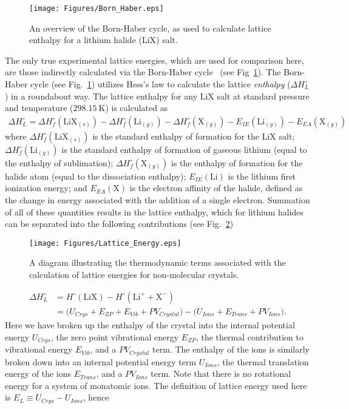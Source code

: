 \documentclass[preprint,aps,prb,floatfix]{revtex4-1}
\begin{document}
\begin{figure}
	\centering
	\texttt{[image: Figures/Born\_Haber.eps]}
	\caption{An overview of the Born-Haber cycle, as used to calculate lattice enthalpy for a lithium halide (LiX) salt.}
	\label{fig:Born_Haber}
\end{figure}
%
The only true experimental lattice energies, which are used for comparison here, are those indirectly calculated via the Born-Haber cycle~\cite{book:CRC,Jenkins2005,ladd1959calculation} (see Fig~\ref{fig:Born_Haber}). The Born-Haber cycle (see Fig.~\ref{fig:Born_Haber}) utilizes Hess's law to calculate the lattice \textit{enthalpy} ($\Delta H^{\circ}_{L}$) in a roundabout way. The lattice enthalpy for any LiX salt at standard pressure and temperature ($\SI{298.15}{\kelvin}$) is calculated as
\begin{align}
\Delta H^{\circ}_{L} = \Delta H^{\circ}_{f} (\text{LiX}_{(s)}) - \Delta H_{f}^{\circ} (\text{Li}_{(g)}) - \Delta H^{\circ}_{f} (\text{X}_{(g)}) - E_{IE} (\text{Li}_{(g)}) - E_{EA} (\text{X}_{(g)})
\end{align}
where $\Delta H^{\circ}_{f} (\text{LiX}_{(s)})$ is the standard enthalpy of formation for the LiX salt; $\Delta H_{f}^{\circ} (\text{Li}_{(g)})$ is the standard enthalpy of formation of gaseous lithium (equal to the enthalpy of sublimation); $\Delta H^{\circ}_{f} (\text{X}_{(g)})$ is the enthalpy of formation for the halide atom (equal to the dissociation enthalpy); $E_{IE} (\text{Li})$ is the lithium first ionization energy; and $E_{EA} (\text{X})$ is the electron affinity of the halide, defined as the change in energy associated with the addition of a single electron. Summation of all of these quantities results in the lattice enthalpy, which for lithium halides can be separated into the following contributions (see Fig.~\ref{fig:Lattice_Energy})
%
\begin{figure}
	\centering
	\texttt{[image: Figures/Lattice\_Energy.eps]}
	\caption{A diagram illustrating the thermodynamic terms associated with the calculation of lattice energies for non-molecular crystals.}
	\label{fig:Lattice_Energy}
\end{figure}
%
\begin{align}
\Delta H^{\circ}_{L} &= H^{\circ}(\text{LiX}) - H^{\circ} (\text{Li}^{+} + \text{X}^{-})\\
&= \big( U_{Crys} + E_{ZP} + E_{Vib} + PV_{Crystal} \big) - \big( U_{Ions} + E_{Trans} + PV_{Ions} \big).
\end{align}
Here we have broken up the enthalpy of the crystal into the internal potential energy $U_{Crys}$, the zero point vibrational energy $E_{ZP}$, the thermal contribution to vibrational energy $E_{Vib}$, and a $PV_{Crystal}$ term. The enthalpy of the ions is similarly broken down into an internal potential energy term $U_{Ions}$, the thermal translation energy of the ions $E_{Trans}$, and a $PV_{Ions}$ term. Note that there is no rotational energy for a system of monatomic ions. The definition of lattice energy used here is \mbox{$E_{L} \equiv U_{Crys} - U_{Ions}$}, hence
\end{document}
